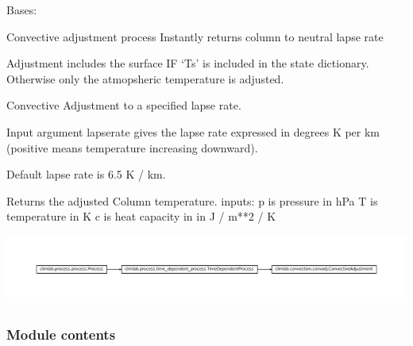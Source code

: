 \documentclass[letterpaper,10pt,english]{sphinxmanual}
\begin{document}

\begin{fulllineitems}
\label{api/climlab.convection:climlab.convection.convadj.ConvectiveAdjustment}
Bases: {\hyperref[api/climlab.process:climlab.process.time_dependent_process.TimeDependentProcess]{\emph{}}}

Convective adjustment process
Instantly returns column to neutral lapse rate

Adjustment includes the surface IF `Ts' is included in the state
dictionary. Otherwise only the atmopsheric temperature is adjusted.

\end{fulllineitems}


\begin{fulllineitems}
\label{api/climlab.convection:climlab.convection.convadj.convective_adjustment_direct}
Convective Adjustment to a specified lapse rate.

Input argument lapserate gives the lapse rate expressed in degrees K per km
(positive means temperature increasing downward).

Default lapse rate is 6.5 K / km.

Returns the adjusted Column temperature.
inputs:
p is pressure in hPa
T is temperature in K
c is heat capacity in in J / m**2 / K

\end{fulllineitems}


\includegraphics{inheritance-f95e9eb0825078bd01b596c489a95dda67879cbd.pdf}


\subsubsection{Module contents}
\label{api/climlab.convection:module-climlab.convection}\label{api/climlab.convection:module-contents}
\end{document}
